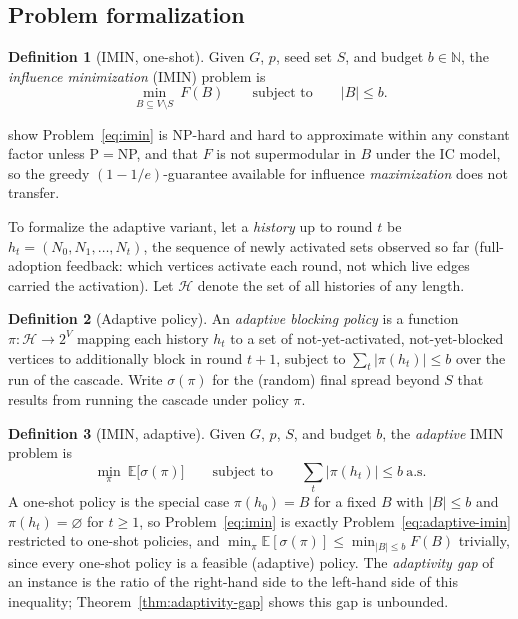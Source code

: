 \documentclass[preprint,11pt]{elsarticle}
\theoremstyle{definition}
\newtheorem{definition}{Definition}
\theoremstyle{remark}
\newcommand{\FF}{F}
\begin{document}
\subsection{Problem formalization}\label{sec:formalization}

\begin{definition}[IMIN, one-shot]\label{def:imin}
Given $G$, $p$, seed set $S$, and budget $b\in\mathbb N$, the
\emph{influence minimization} (IMIN) problem is
\begin{equation}\label{eq:imin}
\min_{B\subseteq V\setminus S}\ \FF(B)
\qquad\text{subject to}\qquad
|B|\le b.
\end{equation}
\end{definition}

\noindent \citet{xie2023} show Problem~\eqref{eq:imin} is NP-hard and hard
to approximate within any constant factor unless P$=$NP, and that $\FF$ is
not supermodular in $B$ under the IC model, so the greedy
$(1-1/e)$-guarantee available for influence \emph{maximization}
\citep{kempe2003} does not transfer.

To formalize the adaptive variant, let a \emph{history} up to round $t$ be
$h_t=(N_0,N_1,\dots,N_t)$, the sequence of newly activated sets observed so
far (full-adoption feedback: which vertices activate each round, not which
live edges carried the activation). Let $\mathcal H$ denote the set of all
histories of any length.

\begin{definition}[Adaptive policy]\label{def:policy}
An \emph{adaptive blocking policy} is a function
$\pi:\mathcal H\to 2^V$ mapping each history $h_t$ to a set of
not-yet-activated, not-yet-blocked vertices to additionally block in round
$t+1$, subject to $\sum_{t}|\pi(h_t)|\le b$ over the run of the cascade.
Write $\sigma(\pi)$ for the (random) final spread beyond $S$ that results
from running the cascade under policy $\pi$.
\end{definition}

\begin{definition}[IMIN, adaptive]\label{def:adaptive-imin}
Given $G$, $p$, $S$, and budget $b$, the \emph{adaptive} IMIN problem is
\begin{equation}\label{eq:adaptive-imin}
\min_{\pi}\ \mathbb E\bigl[\sigma(\pi)\bigr]
\qquad\text{subject to}\qquad
\textstyle\sum_t|\pi(h_t)|\le b\ \text{a.s.}
\end{equation}
A one-shot policy is the special case $\pi(h_0)=B$ for a fixed
$B$ with $|B|\le b$ and $\pi(h_t)=\varnothing$ for $t\ge1$, so
Problem~\eqref{eq:imin} is exactly Problem~\eqref{eq:adaptive-imin}
restricted to one-shot policies, and
$\min_\pi\mathbb E[\sigma(\pi)]\le\min_{|B|\le b}\FF(B)$ trivially, since
every one-shot policy is a feasible (adaptive) policy. The
\emph{adaptivity gap} of an instance is the ratio of the right-hand side to
the left-hand side of this inequality; Theorem~\ref{thm:adaptivity-gap}
shows this gap is unbounded.
\end{definition}
\end{document}

